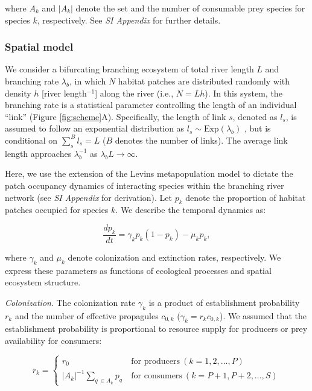 \documentclass[11pt, class=article, crop=false]{standalone}
\begin{document}
where $A_{k}$ and $|A_{k}|$ denote the set and the number of consumable prey species for species $k$, respectively.
See \textit{SI Appendix} for further details.

\subsubsection{Spatial model}

We consider a bifurcating branching ecosystem of total river length $L$ and branching rate $\lambda_b$, in which $N$ habitat patches are distributed randomly with density $h$ [river length$^{-1}$] along the river (i.e., $N = Lh$).
In this system, the branching rate is a statistical parameter controlling the length of an individual ``link'' (Figure \ref{fig:scheme}A).
Specifically, the length of link $s$, denoted as $l_s$, is assumed to follow an exponential distribution as $l_s \sim \mbox{Exp}(\lambda_b)$ \citep{peckham_reformulation_1999, terui_metapopulation_2018, terui_emergent_2021}, but is conditional on $\sum_s^B l_s = L$ ($B$ denotes the number of links).
The average link length approaches $\lambda_b^{-1}$ as $\lambda_b L \rightarrow \infty$.

Here, we use the extension of the Levins metapopulation model to dictate the patch occupancy dynamics of interacting species within the branching river network \citep{calcagno_constraints_2011, takimoto_effects_2012, guo_towards_2023} (see \textit{SI Appendix} for derivation).
Let $p_k$ denote the proportion of habitat patches occupied for species $k$.
We describe the temporal dynamics as:

\begin{equation}
    \frac{dp_k}{dt} = \gamma_{k} p_k (1 - p_k) - \mu_k p_k,
\end{equation}

where $\gamma_k$ and $\mu_k$ denote colonization and extinction rates, respectively.
We express these parameters as functions of ecological processes and spatial ecosystem structure.

\textit{Colonization}. The colonization rate $\gamma_k$ is a product of establishment probability $r_k$ and the number of effective propagules $c_{0,k}$ ($\gamma_k = r_k c_{0,k}$).
We assumed that the establishment probability is proportional to resource supply for producers or prey availability for consumers:

\begin{equation}
    r_{k} = 
    \begin{cases}
        r_0 & ~\text{for producers}~ (k=1, 2, \ldots, P)\\
        |A_{k}|^{-1} \sum_{q~\in A_{k}} p_{q} & ~\text{for consumers}~ (k=P+1, P+2, \ldots, S)
    \end{cases}
\end{equation}
\end{document}
